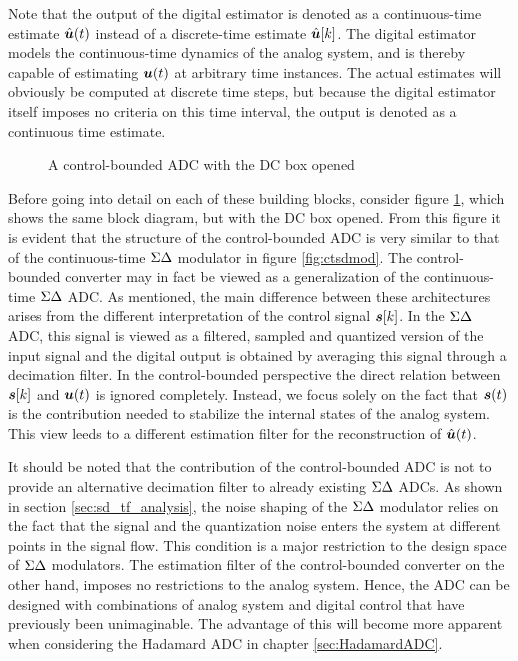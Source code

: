 Note that the output of the digital estimator is denoted as a continuous-time estimate $\hat{\bm{u}}(t)$ instead of a discrete-time estimate $\hat{\bm{u}}[k]$. The digital estimator models the continuous-time dynamics of the analog system, and is thereby capable of estimating $\bm{u}(t)$ at arbitrary time instances. The actual estimates will obviously be computed at discrete time steps, but because the digital estimator itself imposes no criteria on this time interval, the output is denoted as a continuous time estimate.

\begin{figure}[htbp]
    \centering
    
    \caption{A control-bounded ADC with the DC box opened}
    \label{fig:cbadc2}
\end{figure}

Before going into detail on each of these building blocks, consider figure \ref{fig:cbadc2}, which shows the same block diagram, but with the DC box opened. From this figure it is evident that the structure of the control-bounded ADC is very similar to that of the continuous-time $\Sigma\Delta$ modulator in figure \ref{fig:ctsdmod}. The control-bounded converter may in fact be viewed as a generalization of the continuous-time $\Sigma\Delta$ ADC. As mentioned, the main difference between these architectures arises from the different interpretation of the control signal $\bm{s}[k]$. In the $\Sigma\Delta$ ADC, this signal is viewed as a filtered, sampled and quantized version of the input signal and the digital output is obtained by averaging this signal through a decimation filter. In the control-bounded perspective the direct relation between $\bm{s}[k]$ and $\bm{u}(t)$ is ignored completely. Instead, we focus solely on the fact that $\bm{s}(t)$ is the contribution needed to stabilize the internal states of the analog system. This view leeds to a different estimation filter for the reconstruction of $\hat{\bm{u}}(t)$.

It should be noted that the contribution of the control-bounded ADC is not to provide an alternative decimation filter to already existing $\Sigma\Delta$ ADCs. As shown in section \ref{sec:sd_tf_analysis}, the noise shaping of the $\Sigma\Delta$ modulator relies on the fact that the signal and the quantization noise enters the system at different points in the signal flow. This condition is a major restriction to the design space of $\Sigma\Delta$ modulators. The estimation filter of the control-bounded converter on the other hand, imposes no restrictions to the analog system. Hence, the ADC can be designed with combinations of analog system and digital control that have previously been unimaginable. The advantage of this will become more apparent when considering the Hadamard ADC in chapter \ref{sec:HadamardADC}.



























